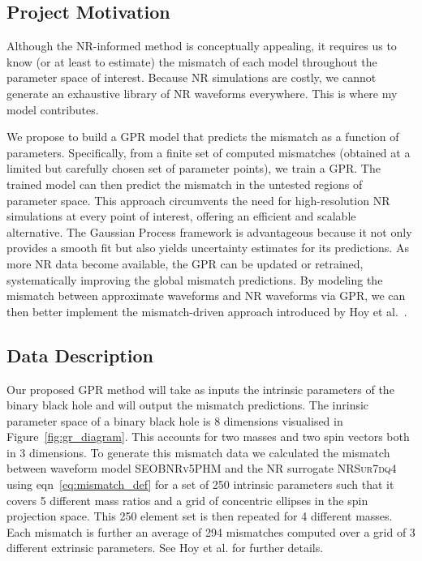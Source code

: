\documentclass[10pt]{article}
\begin{document}
\subsection{Project Motivation}
Although the NR-informed method is conceptually appealing, it requires us to know (or at least to estimate) 
the mismatch of each model throughout the parameter space of interest. Because
NR simulations are costly, we cannot generate an exhaustive library of NR waveforms
everywhere. This is where my model contributes.
%
%

We propose to build a GPR model that predicts the mismatch as a function of parameters. Specifically, from a finite set of computed mismatches (obtained at a limited but carefully chosen set of parameter points), we train a GPR.
The trained model can then predict the mismatch in the untested regions of parameter space. This approach circumvents the need for high-resolution NR simulations at every point of interest,
offering an efficient and scalable alternative. The Gaussian Process framework is advantageous because it not only provides a smooth fit but also yields uncertainty estimates for its predictions.
As more NR data become available, the GPR can be updated or retrained, systematically improving the global mismatch predictions.
By modeling the mismatch between approximate waveforms and NR waveforms via GPR, we can then better implement the mismatch-driven approach introduced by Hoy et al.~\cite{Ogpaper}. 

\subsection{Data Description}
\label{sec:data_description}
Our proposed GPR method will take as inputs the intrinsic parameters of the binary black hole and will output the mismatch predictions.
The inrinsic parameter space of a binary black hole is 8 dimensions visualised in Figure~\ref{fig:gr_diagram}. This accounts for two masses and two spin vectors both in 3 dimensions. 
To generate this mismatch data we calculated the mismatch between waveform model \textsc{SEOBNRv5PHM} \cite{bestNRfitS} and the NR surrogate \textsc{NRSur7dq4} \cite{NRsurrogate} using eqn~\eqref{eq:mismatch_def} for a set of 250 intrinsic parameters 
such that it covers 5 different mass ratios and a grid of concentric ellipses in the spin projection space.
This 250 element set is then repeated for 4 different masses.
Each mismatch is further an average of 294 mismatches computed over a grid of 3 different extrinsic parameters.
See Hoy et al. for further details.
%
\end{document}
